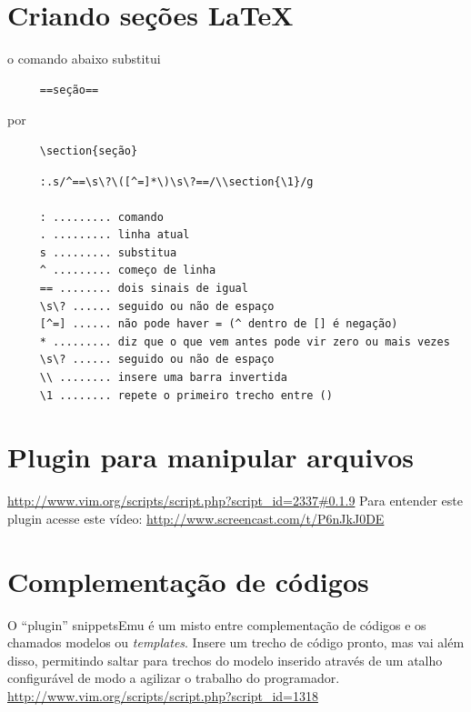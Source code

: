 \documentclass[10pt,a4paper,openany]{book}
\begin{document}
\section{Criando seções \LaTeX}\label{Criando seções latex}
o comando abaixo substitui

\begin{verbatim}
     ==seção==
\end{verbatim}

   por

\begin{verbatim}
     \section{seção}
\end{verbatim}

\begin{verbatim}
     :.s/^==\s\?\([^=]*\)\s\?==/\\section{\1}/g
     
     : ......... comando
     . ......... linha atual
     s ......... substitua
     ^ ......... começo de linha
     == ........ dois sinais de igual
     \s\? ...... seguido ou não de espaço
     [^=] ...... não pode haver = (^ dentro de [] é negação)
     * ......... diz que o que vem antes pode vir zero ou mais vezes
     \s\? ...... seguido ou não de espaço
     \\ ........ insere uma barra invertida
     \1 ........ repete o primeiro trecho entre ()
\end{verbatim}

\section{Plugin para manipular arquivos}
\url{http://www.vim.org/scripts/script.php?script_id=2337#0.1.9}
Para entender este plugin acesse este vídeo:
 \url{http://www.screencast.com/t/P6nJkJ0DE}


\section{Complementação de códigos}
\label{Complementação de códigos}

O ``plugin'' snippetsEmu é um misto entre complementação de códigos e
os chamados modelos ou {\em templates}. Insere um trecho de código pronto,
mas vai além disso, permitindo saltar para trechos do modelo inserido
através de um atalho configurável de modo a agilizar o trabalho do
programador. \url{http://www.vim.org/scripts/script.php?script\_id=1318}
\end{document}

